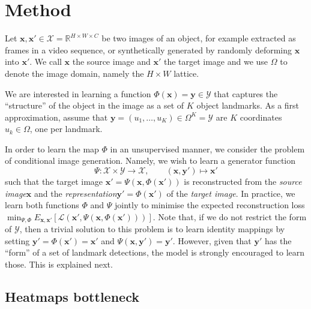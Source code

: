 \documentclass{article}
\newcommand{\bx}{\mathbf{x}}
\newcommand{\by}{\mathbf{y}}
\begin{document}
\section{Method}\label{s:method}


Let $\bx,\bx'\in \mathcal{X}=\mathbb{R}^{H\times W\times C}$ be two images of an object, for example extracted as frames in a video sequence, or synthetically generated by randomly deforming $\bx$ into $\bx'$. We call $\bx$ the source image and $\bx'$ the target image and we use $\Omega$ to denote the image domain, namely the $H{\times}W$ lattice.


We are interested in learning a function $\Phi(\bx)=\by\in\mathcal{Y}$ that captures the ``structure'' of the object in the image as a set of $K$ object landmarks. As a first approximation, assume that $\by = (u_1,\dots,u_K) \in \Omega^K = \mathcal{Y}$ are $K$ coordinates $u_k\in\Omega$, one per landmark.


In order to learn the map $\Phi$ in an unsupervised manner, we consider the problem of conditional image generation. Namely, we wish to learn a generator function
$$
 \Psi : \mathcal{X} \times \mathcal{Y} \rightarrow \mathcal{X},
 \qquad
 (\bx,\by') \mapsto \bx'
$$
such that the target image $\bx' = \Psi(\bx,\Phi(\bx'))$ is reconstructed from the \emph{source image}$\bx$ and the \emph{representation}$\by'=\Phi(\bx')$ of the \emph{target image}. In practice, we learn both functions $\Phi$ and $\Psi$ jointly to minimise the expected reconstruction loss
$
 \min_{\Psi,\Phi} E_{\bx,\bx'}
 \left[
 \mathcal{L}(\bx', \Psi(\bx,\Phi(\bx')))
 \right].
$
Note that, if we do not restrict the form of $\mathcal{Y}$, then a trivial solution to this problem is to learn identity mappings by setting $\by' = \Phi(\bx') = \bx'$ and $\Psi(\bx,\by')=\by'$. However, given that $\by'$ has the ``form'' of a set of landmark detections, the model is strongly encouraged to learn those. This is explained next.


\subsection{Heatmaps bottleneck}\label{s:heatmaps}
\end{document}
